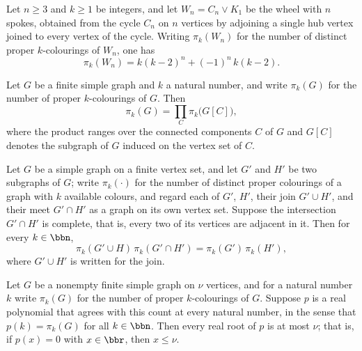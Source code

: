 \begin{theorem}
\label{SimpleGraph.numColorings_wheel}
\leanok
{}
Let $n \ge 3$ and $k \ge 1$ be integers, and let $W_n = C_n \vee K_1$ be the wheel with
$n$ spokes, obtained from the cycle $C_n$ on $n$ vertices by adjoining a single hub
vertex joined to every vertex of the cycle. Writing $\pi_k(W_n)$ for the number of
distinct proper $k$-colourings of $W_n$, one has
\[ \pi_k(W_n) = k(k-2)^n + (-1)^n\, k(k-2). \]
\end{theorem}

\begin{theorem}
\label{SimpleGraph.numColorings_eq_prod_components}
\leanok
{}
Let $G$ be a finite simple graph and $k$ a natural number, and write $\pi_k(G)$ for the
number of proper $k$-colourings of $G$. Then
\[
  \pi_k(G) = \prod_{C} \pi_k\bigl(G[C]\bigr),
\]
where the product ranges over the connected components $C$ of $G$ and $G[C]$ denotes the
subgraph of $G$ induced on the vertex set of $C$.
\end{theorem}

\begin{theorem}
\label{SimpleGraph.numColorings_union_mul_inter}
\leanok
{}
Let $G$ be a simple graph on a finite vertex set, and let $G'$ and $H'$ be two subgraphs
of $G$; write $\pi_k(\cdot)$ for the number of distinct proper colourings of a graph
with $k$ available colours, and regard each of $G'$, $H'$, their join $G' \cup H'$, and
their meet $G' \cap H'$ as a graph on its own vertex set. Suppose the intersection $G'
\cap H'$ is complete, that is, every two of its vertices are adjacent in it. Then for
every $k \in \bbn$, \[ \pi_k(G' \cup H)\,\pi_k(G' \cap H') = \pi_k(G')\,\pi_k(H'), \]
where $G' \cup H'$ is written for the join.
\end{theorem}

\begin{theorem}
\label{SimpleGraph.chromaticPolynomial_no_root_gt_card}
\leanok
{}
Let $G$ be a nonempty finite simple graph on $\nu$ vertices, and for a natural number
$k$ write $\pi_k(G)$ for the number of proper $k$-colourings of $G$. Suppose $p$ is a
real polynomial that agrees with this count at every natural number, in the sense that
$p(k) = \pi_k(G)$ for all $k \in \bbn$. Then every real root of $p$ is at most $\nu$;
that is, if $p(x) = 0$ with $x \in \bbr$, then $x \le \nu$.
\end{theorem}

